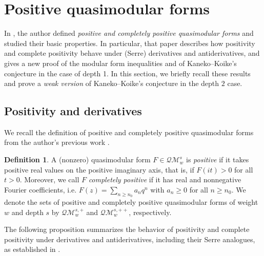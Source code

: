 \documentclass[10pt,reqno]{amsproc}
\newcommand{\QM}{\mathcal{QM}}
\newcommand{\1}{\mathds{1}}	%
\theoremstyle{definition}
\newtheorem{definition}[theorem]{Definition}
\theoremstyle{remark}
\begin{document}
\section{Positive quasimodular forms}

In \cite{lee2024algebraic}, the author defined \emph{positive and completely positive quasimodular forms} and studied their basic properties.
In particular, that paper describes how positivity and complete positivity behave under (Serre) derivatives and antiderivatives, and gives a new proof of the modular form inequalities and of Kaneko--Koike's conjecture in the case of depth 1.
In this section, we briefly recall these results and prove a \emph{weak version} of Kaneko--Koike's conjecture in the depth $2$ case.


\subsection{Positivity and derivatives}

We recall the definition of positive and completely positive quasimodular forms from the author's previous work \cite{lee2024algebraic}.

\begin{definition}
\label{def:posqm}
A (nonzero) quasimodular form $F \in \QM_{w}^{s}$ is \emph{positive} if it takes positive real values on the positive imaginary axis, that is, if $F(it) > 0$ for all $t > 0$.
Moreover, we call $F$ \emph{completely positive} if it has real and nonnegative Fourier coefficients, i.e. $F(z) = \sum_{n \geq n_0} a_n q^n$ with $a_n \geq 0$ for all $n \geq n_0$.
We denote the sets of positive and completely positive quasimodular forms of weight $w$ and depth $s$ by $\QM_{w}^{s, +}$ and $\QM_{w}^{s, ++}$, respectively.
\end{definition}

The following proposition summarizes the behavior of positivity and complete positivity under derivatives and antiderivatives, including their Serre analogues, as established in \cite[Section 3]{lee2024algebraic}.
\end{document}
